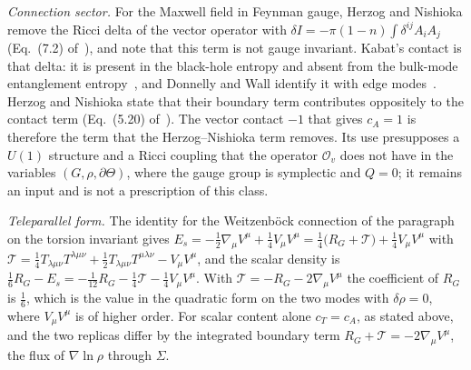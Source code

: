\emph{Connection sector.} For the Maxwell field in Feynman gauge, Herzog and Nishioka remove the Ricci delta of the vector operator with \(\delta I=-\pi(1-n)\int\delta^{ij}A_iA_j\) (Eq.~(7.2) of~\cite{HerzogNishioka2016}), and note that this term is not gauge invariant. Kabat's contact is that delta: it is present in the black-hole entropy and absent from the bulk-mode entanglement entropy~\cite{Kabat1995}, and Donnelly and Wall identify it with edge modes~\cite{DonnellyWall2016}. Herzog and Nishioka state that their boundary term contributes oppositely to the contact term (Eq.~(5.20) of~\cite{HerzogNishioka2016}). The vector contact \(-1\) that gives \(c_A=1\) is therefore the term that the Herzog--Nishioka term removes. Its use presupposes a \(U(1)\) structure and a Ricci coupling that the operator \(\mathcal O_v\) does not have in the variables \((G,\rho,\partial\Theta)\), where the gauge group is symplectic and \(Q=0\); it remains an input and is not a prescription of this class.



\emph{Teleparallel form.} The identity for the Weitzenb\"ock connection of the paragraph on the torsion invariant gives \(E_s=-\tfrac12\nabla_\mu V^\mu+\tfrac14V_\mu V^\mu=\tfrac14\bigl(R_G+\mathcal T\bigr)+\tfrac14V_\mu V^\mu\) with \(\mathcal T=\tfrac14T_{\lambda\mu\nu}T^{\lambda\mu\nu}+\tfrac12T_{\lambda\mu\nu}T^{\mu\lambda\nu}-V_\mu V^\mu\), and the scalar density is \(\tfrac16R_G-E_s=-\tfrac1{12}R_G-\tfrac14\mathcal T-\tfrac14V_\mu V^\mu\). With \(\mathcal T=-R_G-2\nabla_\mu V^\mu\) the coefficient of \(R_G\) is \(\tfrac16\), which is the value in the quadratic form on the two modes with \(\delta\rho=0\), where \(V_\mu V^\mu\) is of higher order. For scalar content alone \(c_T=c_A\), as stated above, and the two replicas differ by the integrated boundary term \(R_G+\mathcal T=-2\nabla_\mu V^\mu\), the flux of \(\nabla\ln\rho\) through \(\Sigma\).



